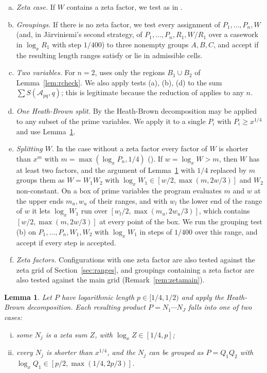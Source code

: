 \documentclass[11pt]{amsart}
\newtheorem{lemma}[theorem]{Lemma}
\theoremstyle{definition}
\theoremstyle{remark}
\newcommand{\J}{\cite{J}}
\begin{document}
\begin{enumerate}[(a)]
\item \emph{Zeta case.} If $W$ contains a zeta factor, we test \cite[Proposition~6.1(iii)]{J} as in \J{}.
\item \emph{Groupings.} If there is no zeta factor, we test every assignment of $P_1,\dots,P_n,W$ (and, in Järviniemi's second strategy, of $P_1,\dots,P_n,R_1,W/R_1$ over a casework in $\log_xR_1$ with step $1/400$) to three nonempty groups $A,B,C$, and accept if the resulting length ranges satisfy \cite[Proposition~6.1(i) or (ii)]{J} or lie in admissible cells.
\item \emph{Two variables.} For $n=2$, \J{} uses only the regions $B_1\cup B_2$ of Lemma~\ref{lem:rcheck}. We also apply tests (a), (b), (d) to the sum $\sum S(\mathcal A_{pq},q)$; this is legitimate because the reduction of \cite[Section~4]{J} applies to any $n$.
\item \emph{One Heath-Brown split.} By \cite[Remark~4.10]{J} the Heath-Brown decomposition may be applied to any subset of the prime variables. We apply it to a single $P_i$ with $P_i\ge x^{1/4}$ and use Lemma~\ref{lem:split}.
\item \emph{Splitting $W$.} In the case without a zeta factor every factor of $W$ is shorter than $x^{m}$ with $m=\max(\log_xP_n,1/4)$ (\cite[Information~4.15, Remark~4.17]{J}). If $w=\log_xW>m$, then $W$ has at least two factors, and the argument of Lemma~\ref{lem:split} with $1/4$ replaced by $m$ groups them as $W=W_1W_2$ with $\log_xW_1\in[w/2,\max(m,2w/3)]$ and $W_2$ non-constant. On a box of prime variables the program evaluates $m$ and $w$ at the upper ends $m_u,w_u$ of their ranges, and with $w_l$ the lower end of the range of $w$ it lets $\log_xW_1$ run over $[w_l/2,\max(m_u,2w_u/3)]$, which contains $[w/2,\max(m,2w/3)]$ at every point of the box. We run the grouping test (b) on $P_1,\dots,P_n,W_1,W_2$ with $\log_xW_1$ in steps of $1/400$ over this range, and accept if every step is accepted.
\item \emph{Zeta factors.} Configurations with one zeta factor are also tested against the zeta grid of Section~\ref{sec:ranges}, and groupings containing a zeta factor are also tested against the main grid (Remark~\ref{rem:zetamain}).
\end{enumerate}

\begin{lemma}\label{lem:split}
Let $P$ have logarithmic length $p\in[1/4,1/2)$ and apply the Heath-Brown decomposition. Each resulting product $P=N_1\cdots N_J$ falls into one of two cases:
\begin{enumerate}[(i)]
\item some $N_j$ is a zeta sum $Z$, with $\log_xZ\in[1/4,p]$;
\item every $N_j$ is shorter than $x^{1/4}$, and the $N_j$ can be grouped as $P=Q_1Q_2$ with $\log_xQ_1\in[p/2,\max(1/4,2p/3)]$.
\end{enumerate}
\end{lemma}
\end{document}
